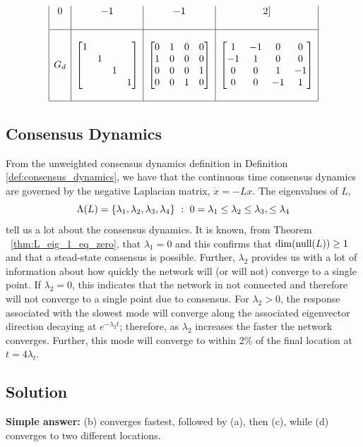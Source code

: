 \documentclass[]{article}
\numberwithin{equation}{section}
\newcommand{\st}{\ : \ }
\begin{document}
\begin{table}
\[\begin{array}{|c|c|c|c|}
				0	&-1	&-1	&2
			]\\
		&&&\\\hline&&&\\	
		G_d
			&\mqty[\dmat{1,1,1,1}]
			&\mqty[
				0	&1	&0	&0\\
				1	&0	&0	&0\\
				0	&0	&0	&1\\
				0	&0	&1	&0
			]
			&\mqty[
				1	&-1	&0	&0\\
				-1	&1	&0	&0\\
				0	&0	&1	&-1\\
				0	&0	&-1	&1
			]\\
		&&&\\\hline
	\end{array}\]
	\label{tbl:pblm7_matrices}
\end{table}

\subsection{Consensus Dynamics}
From the unweighted consensus dynamics definition in Definition \ref{def:consensus_dynamics}, we have that the continuous time consensus dynamics are governed by the negative Laplacian matrix, $\dot{x} = - L x$.
The eigenvalues of $L$, \[
	\Lambda(L) = \qty{\lambda_1, \lambda_2, \lambda_3, \lambda_4} 
	\st 0 = \lambda_1 \leq \lambda_2 \leq \lambda_3, \leq \lambda_4
\] tell us a lot about the consensus dynamics.
It is known, from Theorem \ \ref{thm:L_eig_1_eq_zero}, that $\lambda_1 = 0$ and this confirms that $\dim(\textnormal{null}\qty(L)) \geq 1$ and that a stead-state consensus is possible.
Further, $\lambda_2$ provides us with a lot of information about how quickly the network will (or will not) converge to a single point.
If $\lambda_2 = 0$, this indicates that the network in not connected and therefore will not converge to a single point due to consensus.
For $\lambda_2 > 0$, the response associated with the slowest mode will converge along the associated eigenvector direction decaying at $e^{-\lambda_2 t}$; 
therefore, as $\lambda_2$ increases the faster the network converges.
Further, this mode will converge to within 2\% of the final location at $t = 4 \lambda_t$.

\newpage
\subsection{Solution}
\textbf{Simple answer:} 
(b) converges fastest, followed by (a), then (c), while (d) converges to two different locations.
\end{document}
